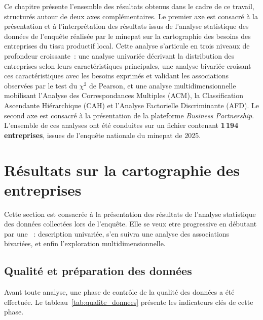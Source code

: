 \documentclass[12pt, a4paper, oneside]{report}
\begin{document}
	Ce chapitre présente l'ensemble des résultats obtenus dans le cadre
	de ce travail, structurés autour de deux axes complémentaires. Le
	premier axe est consacré à la présentation et à l'interprétation des
	résultats issus de l'analyse statistique des données de l'enquête
	réalisée par le \gls{minepat} sur la cartographie des besoins des
	entreprises du tissu productif local. Cette analyse s'articule en
	trois niveaux de profondeur croissante~: une analyse univariée
	décrivant la distribution des entreprises selon leurs caractéristiques
	principales, une analyse bivariée croisant ces caractéristiques avec
	les besoins exprimés et validant les associations observées par le
	test du $\chi^2$ de Pearson, et une analyse multidimensionnelle
	mobilisant l'Analyse des Correspondances Multiples (ACM), la
	Classification Ascendante Hiérarchique (CAH) et l'Analyse Factorielle
	Discriminante (AFD). Le second axe est consacré à la présentation de
	la plateforme \textit{Business Partnership}. L'ensemble de ces
	analyses ont été conduites sur un fichier contenant
	\textbf{1\,194 entreprises}, issues de l'enquête nationale du
	\gls{minepat} de 2025.
	
	\section{Résultats sur la cartographie des entreprises}
	\label{sec:resultats_carto}
	
	Cette section est consacrée à la présentation des résultats de l'analyse statistique des
	données collectées lors de l'enquête. Elle se veux etre progressive en débutant par une ~: description
	univariée, s'en suivra une analyse des associations bivariées, et enfin  l'exploration
	multidimensionnelle.
	\subsection{Qualité et préparation des données}
	
	Avant toute analyse, une phase de contr\^ole de la qualit\'e des
	donn\'ees a \'et\'e effectu\'ee. Le tableau~\ref{tab:qualite_donnees}
	pr\'esente les indicateurs cl\'es de cette phase.
	
\end{document}
